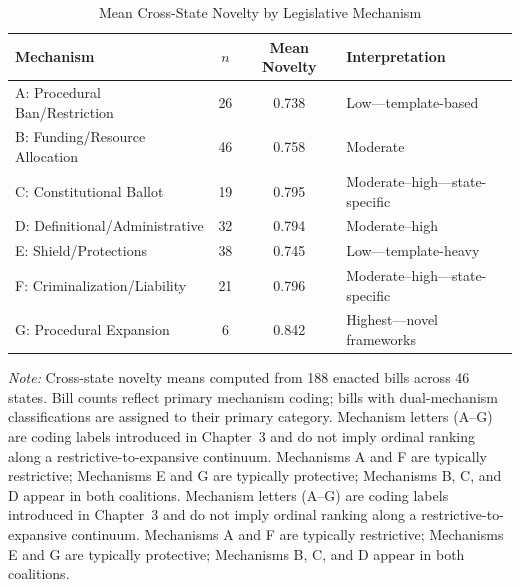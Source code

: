 \begin{table}[htbp]
\centering
\begin{threeparttable}
\caption{Mean Cross-State Novelty by Legislative Mechanism}
\label{tab:mechanism_novelty}
\begin{tabular}{@{}>{\raggedright\arraybackslash}p{5.4cm}cc>{\raggedright\arraybackslash}p{4.6cm}@{}}
\toprule
Mechanism & $n$ & Mean Novelty & Interpretation \\
\midrule
A: Procedural Ban/Restriction      & 26 & 0.738 & Low---template-based \\
B: Funding/Resource Allocation     & 46 & 0.758 & Moderate \\
C: Constitutional Ballot           & 19 & 0.795 & Moderate--high---state-specific \\
D: Definitional/Administrative     & 32 & 0.794 & Moderate--high \\
E: Shield/Protections              & 38 & 0.745 & Low---template-heavy \\
F: Criminalization/Liability       & 21 & 0.796 & Moderate--high---state-specific \\
G: Procedural Expansion            &  6 & 0.842 & Highest---novel frameworks \\
\bottomrule
\end{tabular}
\begin{tablenotes}[flushleft]
\small
\item \textit{Note:} Cross-state novelty means computed from 188 enacted bills across 46 states. Bill counts reflect primary mechanism coding; bills with dual-mechanism classifications are assigned to their primary category. Mechanism letters (A--G) are coding labels introduced in Chapter~3 and do not imply ordinal ranking along a restrictive-to-expansive continuum. Mechanisms A and F are typically restrictive; Mechanisms E and G are typically protective; Mechanisms B, C, and D appear in both coalitions. Mechanism letters (A--G) are coding labels introduced in Chapter~3 and do not imply ordinal ranking along a restrictive-to-expansive continuum. Mechanisms A and F are typically restrictive; Mechanisms E and G are typically protective; Mechanisms B, C, and D appear in both coalitions.
\end{tablenotes}
\end{threeparttable}
\end{table}

